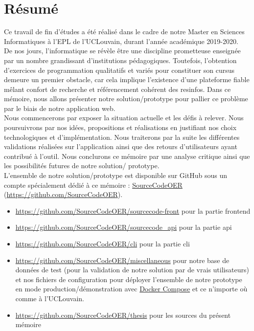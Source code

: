 \chapter*{Résumé}

Ce travail de fin d'études a été réalisé dans le cadre de notre Master en Sciences Informatiques à l'EPL de l'UCLouvain, durant l'année académique 2019-2020.\\

De nos jours, l'informatique se révèle être une discipline prometteuse enseignée par un nombre grandissant d'institutions pédagogiques. Toutefois, l'obtention d'exercices de programmation qualitatifs et variés pour constituer son cursus demeure un premier obstacle, car cela implique l'existence d'une plateforme fiable mêlant confort de recherche et référencement cohérent des \glspl{resinfo}. 
Dans ce mémoire, nous allons présenter notre solution/prototype pour pallier ce problème par le biais de notre application web.\\

Nous commencerons par exposer la situation actuelle et les défis à relever. Nous poursuivrons par nos idées, propositions et réalisations en justifiant nos choix technologiques et d'implémentation. Nous traiterons par la suite les différentes validations réalisées sur l'application ainsi que des retours d'utilisateurs ayant contribué à l'outil. Nous conclurons ce mémoire par une analyse critique ainsi que les possibilités futures de notre solution/ prototype. \\

L'ensemble de notre solution/prototype est disponible sur GitHub sous un compte spécialement dédié à ce mémoire : 
\href{https://github.com/SourceCodeOER}{SourceCodeOER} (\href{https://github.com/SourceCodeOER}{https://github.com/SourceCodeOER}).

\begin{itemize}
    \item \href{https://github.com/SourceCodeOER/sourcecode-front}{https://github.com/SourceCodeOER/sourcecode-front} pour la partie \gls{frontend}
    \item \href{https://github.com/SourceCodeOER/sourcecode\_api}{https://github.com/SourceCodeOER/sourcecode\_api} pour la partie \Gls{api}
    \item \href{https://github.com/SourceCodeOER/cli}{https://github.com/SourceCodeOER/cli} pour la partie \Gls{cli}
    \item \href{https://github.com/SourceCodeOER/miscellaneous}{https://github.com/SourceCodeOER/miscellaneous} pour notre base de données de test (pour la validation de notre solution par de vrais utilisateurs) et nos fichiers de configuration pour déployer l'ensemble de notre prototype en mode production/démonstration avec \href{https://docs.docker.com/compose/}{Docker Compose} et ce n'importe où comme à l'UCLouvain.
    \item \href{https://github.com/SourceCodeOER/thesis}{https://github.com/SourceCodeOER/thesis} pour les sources du présent mémoire
\end{itemize}

